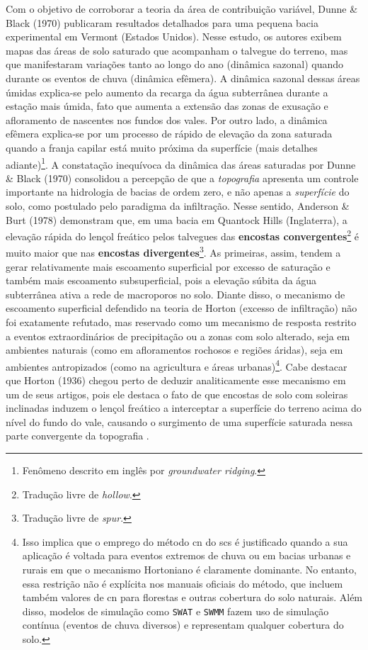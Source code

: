 \documentclass[./main.tex]{subfiles}
\begin{document}
\par Com o objetivo de corroborar a teoria da área de contribuição variável, Dunne \& Black (1970) \cite{Dunne1970} publicaram resultados detalhados para uma pequena bacia experimental em Vermont (Estados Unidos). Nesse estudo, os autores exibem mapas das áreas de solo saturado que acompanham o talvegue do terreno, mas que manifestaram variações tanto ao longo do ano (dinâmica sazonal) quando durante os eventos de chuva (dinâmica efêmera). A dinâmica sazonal dessas áreas úmidas explica-se pelo aumento da recarga da água subterrânea durante a estação mais úmida, fato que aumenta a extensão das zonas de exusação e afloramento de nascentes nos fundos dos vales. Por outro lado, a dinâmica efêmera explica-se por um processo de rápido de elevação da zona saturada quando a franja capilar está muito próxima da superfície (mais detalhes adiante)\footnote{Fenômeno descrito em inglês por \textit{groundwater ridging}.}. A constatação inequívoca da dinâmica das áreas saturadas por Dunne \& Black (1970) consolidou a percepção de que a \textit{topografia} apresenta um controle importante na hidrologia de bacias de ordem zero, e não apenas a \textit{superfície} do solo, como postulado pelo paradigma da infiltração. Nesse sentido, Anderson \& Burt (1978) \cite{Anderson1978} demonstram que, em uma bacia em Quantock Hills (Inglaterra), a elevação rápida do lençol freático pelos talvegues das \textbf{encostas convergentes}\footnote{Tradução livre de \textit{hollow}.} é muito maior que nas \textbf{encostas divergentes}\footnote{Tradução livre de \textit{spur}.}. As primeiras, assim, tendem a gerar relativamente mais escoamento superficial por excesso de saturação e também mais escoamento subsuperficial, pois a elevação súbita da água subterrânea ativa a rede de macroporos no solo. Diante disso, o mecanismo de escoamento superficial defendido na teoria de Horton (excesso de infiltração) não foi exatamente refutado, mas reservado como um mecanismo de resposta restrito a eventos extraordinários de precipitação ou a zonas com solo alterado, seja em ambientes naturais (como em afloramentos rochosos e regiões áridas), seja em ambientes antropizados (como na agricultura e áreas urbanas)\footnote{Isso implica que o emprego do método \acrshort{cn} do \acrshort{scs} é justificado quando a sua aplicação é voltada para eventos extremos de chuva ou em bacias urbanas e rurais em que o mecanismo Hortoniano é claramente dominante. No entanto, essa restrição não é explícita nos manuais oficiais do método, que incluem também valores de \acrshort{cn} para florestas e outras cobertura do solo naturais. Além disso, modelos de simulação como \texttt{SWAT} e \texttt{SWMM} fazem uso de simulação contínua (eventos de chuva diversos) e representam qualquer cobertura do solo.}. Cabe destacar que Horton (1936) \cite{Horton1936} chegou perto de deduzir analiticamente esse mecanismo em um de seus artigos, pois ele destaca o fato de que encostas de solo com soleiras inclinadas induzem o lençol freático a interceptar a superfície do terreno acima do nível do fundo do vale, causando o surgimento de uma superfície saturada nessa parte convergente da topografia \cite{Beven2004b}.
\end{document}

